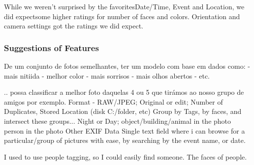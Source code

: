 While we weren't surprised by the favorites\linebreak Date/Time, Event and Location, we did expect\linebreak some higher ratings for number of faces and colors. Orientation and camera settings got the ratings we did expect.




\subsubsection{Suggestions of Features} %
\label{ssub:suggestions_of_features}


De um conjunto de fotos semelhantes, ter um modelo com base em dados como:
- mais nitiida
- melhor color
- mais sorrisos
- mais olhos abertos
- etc.

.. possa classificar a melhor foto daquelas 4 ou 5 que tirámos ao nosso grupo de amigos por exemplo.
Format - RAW/JPEG; Original or edit; Number of Duplicates, Stored Location (disk C:/folder, etc)
Group by Tags, by faces, and intersect these groups...
Night or Day;
object/building/animal in the photo
person in the photo
Other EXIF Data
Single text field where i can browse for a particular/group of pictures with ease, by searching by the event name, or date.

I used to use people tagging, so I could easily find someone.
The faces of people.

















\cleardoublepage

